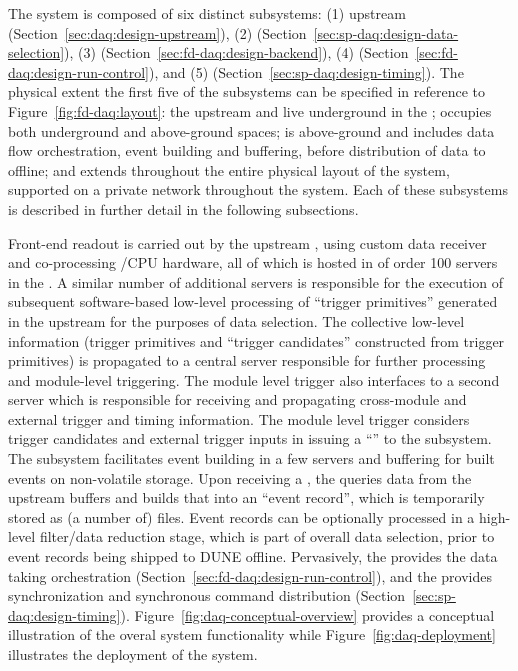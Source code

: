 The   system is composed of six distinct subsystems:
%
(1) upstream  (Section~\ref{sec:daq:design-upstream}),
%
(2)  (Section~\ref{sec:sp-daq:design-data-selection}),
%
(3)  (Section~\ref{sec:fd-daq:design-backend}), 
%
(4)  (Section~\ref{sec:fd-daq:design-run-control}), and
%
(5)  (Section~\ref{sec:sp-daq:design-timing}).
%
The physical extent
the first five of the  subsystems
can be specified in reference to Figure~\ref{fig:fd-daq:layout}: the
upstream  and   live underground in the ;  occupies
both underground and above-ground spaces;  is above-ground
and includes data flow orchestration, event building and buffering, before distribution of data
to offline; and  extends throughout the entire physical layout of the
system, supported on a private network throughout the  system. Each of these subsystems is described in further
detail in the following subsections. 

Front-end readout is carried out by the upstream , using custom data receiver and
co-processing /CPU hardware, all of which is hosted in of order 100 servers in the . A
similar number of additional servers is responsible for the execution
of subsequent software-based low-level processing of ``trigger
primitives''
generated in the upstream  for the purposes of data selection. The collective
low-level information (trigger primitives and ``trigger candidates''
constructed from trigger primitives) is propagated to a central server responsible
for further processing and module-level triggering. The module level
trigger also
interfaces to a second server which is responsible for receiving and
propagating cross-module and external trigger and timing
information. The module level trigger considers trigger candidates and
external trigger inputs in issuing a ``'' to the 
subsystem. The  subsystem 
facilitates event building in a few servers and buffering for built
events on non-volatile storage. Upon receiving a , the 
 queries
data from the upstream  buffers and builds that into an ``event
record'', which is temporarily stored as (a number of) files. Event records can be optionally processed in a high-level
filter/data reduction stage, which is part of overall data selection,
 prior to event records being shipped to DUNE offline. Pervasively,
 the   provides the data taking orchestration
 (Section~\ref{sec:fd-daq:design-run-control}), and the
  provides synchronization and synchronous command distribution
 (Section~\ref{sec:sp-daq:design-timing}). Figure~\ref{fig:daq-conceptual-overview}
 provides a conceptual illustration of the overal  system
 functionality while Figure~\ref{fig:daq-deployment} illustrates the deployment of the system.


